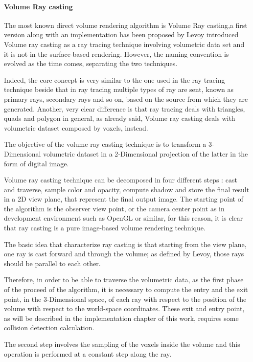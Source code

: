 \documentclass[10pt,a4paper]{article}
\begin{document}
\paragraph{Volume Ray casting}
The most known direct volume rendering algorithm is Volume Ray casting,a first version along with an implementation has been proposed by %
Levoy introduced Volume ray casting as a ray tracing technique involving volumetric data set and it is not in the surface-based rendering. However, the naming convention is evolved as the time comes, separating the two techniques.

Indeed, the core concept is very similar to the one used in the ray tracing technique beside that in ray tracing multiple types of ray are sent, known as primary rays, secondary rays and so on, based on the source from which they are generated. Another, very clear difference is that ray tracing deals with triangles, quads and polygon in general, as already said, Volume ray casting deals with volumetric dataset composed by voxels, instead.

The objective of the volume ray casting technique is to transform a 3-Dimensional volumetric dataset in a 2-Dimensional projection of the latter in the form of digital image.

Volume ray casting technique can be decomposed in four different steps %
: cast and traverse, sample color and opacity, compute shadow and store the final result in a 2D view plane, that represent the final output image.
The starting point of the algorithm is the observer view point, or the camera center point as in development environment such as OpenGL or similar, for this reason, it is clear that ray casting is a pure image-based volume rendering technique.

The basic idea that characterize ray casting is that starting from the view plane, one ray is cast forward and through the volume; as defined by Levoy, those rays should be parallel to each other.

Therefore, in order to be able to traverse the volumetric data, as the first phase of the proceed of the algorithm, it is necessary to compute the entry and the exit point, in the 3-Dimensional space, of each ray with respect to the position of the volume with respect to the world-space coordinates.%
These exit and entry point, as will be described in the implementation chapter of this work, requires some collision detection calculation. 

The second step involves the sampling of the voxels inside the volume and this operation is performed at a constant step along the ray.
\end{document}

